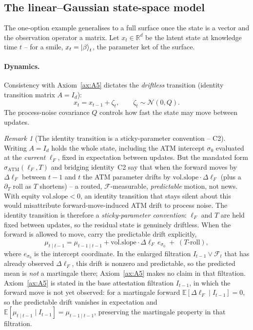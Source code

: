 \documentclass[11pt]{book}
\theoremstyle{plain}
\theoremstyle{definition}
\theoremstyle{remark}
\newtheorem{remark}[theorem]{Remark}
\newcommand{\ket}[1]{\mathinner{\lvert #1 \rangle}}
\newcommand{\parket}{\ket{\beta}}                %
\newcommand{\lF}{\ell_F}                         %
\newcommand{\satm}{\sigma_{\mathrm{ATM}}}        %
\newcommand{\volslope}{\mathrm{vol.slope}}       %
\newcommand{\ncdf}{N}                            %
\newcommand{\Nrm}{\mathcal{N}}                   %
\newcommand{\E}{\mathbb{E}}
\begin{document}
\subsection{The linear--Gaussian state-space model}

The one-option example generalises to a full surface once the state is a
vector and the observation operator a matrix. Let $x_t\in\mathbb{R}^d$ be the
latent state at knowledge time $t$ -- for a smile, $x_t=\parket_t$, the parameter
ket of the surface.

\paragraph{Dynamics.} Consistency with Axiom~\ref{ax:A5} dictates the
\emph{driftless} transition (identity transition matrix $A=I_d$):
\[
    x_t = x_{t-1} + \zeta_t,
    \qquad \zeta_t\sim\Nrm(0,Q).
\]
The process-noise covariance $Q$ controls how fast the state may move between
updates.

\begin{remark}[The identity transition is a sticky-parameter convention -- C2]
Writing $A=I_d$ holds the whole state, including the ATM intercept $\sigma_0$
evaluated at the \emph{current} $\lF$, fixed in expectation between updates. But
the mandated form $\satm(\lF,T)$ and bridging identity~C2 say that when the
forward moves by $\Delta\lF$ between $t-1$ and $t$ the ATM parameter drifts by
$\volslope\cdot\Delta\lF$ (plus a $\partial_T$ roll as $T$ shortens) -- a routed,
$\mathcal{F}$-measurable, \emph{predictable} motion, not news. With equity
$\volslope<0$, an identity transition that stays silent about this would
misattribute forward-move-induced ATM drift to process noise. The identity
transition is therefore a \emph{sticky-parameter convention}: $\lF$ and
$T$ are held fixed between updates, so the residual state is genuinely driftless.
When the forward is allowed to move, carry the predictable drift explicitly,
\[
    \mu_{t\mid t-1}
    = \mu_{t-1\mid t-1} + \volslope\cdot\Delta\lF\,e_{\sigma_0}
      \;+\;(\text{$T$-roll}),
\]
where $e_{\sigma_0}$ is the intercept coordinate. In the enlarged filtration
$I_{t-1}\vee\mathcal{F}_t$ that has already observed $\Delta\lF$, this drift is
nonzero and predictable, so the predicted mean is \emph{not} a martingale there;
Axiom~\ref{ax:A5} makes no claim in that filtration. Axiom~\ref{ax:A5} is stated
in the base attestation filtration $I_{t-1}$, in which the forward move is not yet
observed: for a martingale forward $\E[\Delta\lF\mid I_{t-1}]=0$, so the
predictable drift vanishes in expectation and $\E[\mu_{t\mid t-1}\mid
I_{t-1}]=\mu_{t-1\mid t-1}$, preserving the martingale property in that
filtration.
\end{remark}
\end{document}
